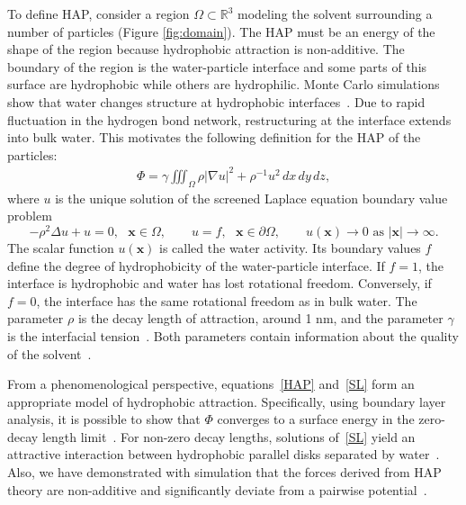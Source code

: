 To define HAP, consider a region $\Omega \subset \mathbb{R}^3$  modeling
the solvent surrounding a number of particles (Figure \ref{fig:domain}).
The HAP must be an energy of the shape of the region because hydrophobic
attraction is non-additive. The boundary of the region is the
water-particle interface and some parts of this surface are hydrophobic
while others are hydrophilic. Monte Carlo simulations show that water
changes structure at hydrophobic interfaces~\cite{Luzar1987,
Jonsson2006, Varilly2011}. Due to rapid fluctuation in the hydrogen bond
network, restructuring at the interface extends into bulk water. This
motivates the following definition for the HAP of the particles:
\begin{align}
\label{HAP}
  \Phi = \gamma \iiint_{\Omega} \rho |\nabla u|^2 + \rho^{-1}u^2 \,dx \,dy \,dz, 
\end{align}
where $u$ is the unique solution of the screened Laplace equation boundary value problem 
\begin{equation}
  \label{SL}
  -\rho^2 \Delta u + u = 0, \mbox{ } \mathbf{x} \in \Omega, \qquad
  u = f,  \mbox{ } \mathbf{x} \in \partial \Omega, \qquad 
  u(\mathbf{x}) \to 0 \mbox{ as } |\mathbf{x}| \to \infty.
\end{equation}
The scalar function $u(\mathbf{x})$ is called the water activity. Its
boundary values $f$ define the degree of hydrophobicity of the
water-particle interface. If $f=1$, the interface is hydrophobic and
water has lost rotational freedom. Conversely, if $f=0$, the interface
has the same rotational freedom as in bulk water. The parameter $\rho$
is the decay length of attraction, around 1 nm, and the parameter
$\gamma$ is the interfacial tension~\cite{Israelachvili1954}. Both
parameters contain information about the quality of the
solvent~\cite{Discher2002}.

From a phenomenological perspective, equations~\eqref{HAP}
and~\eqref{SL} form an appropriate model of hydrophobic attraction.
Specifically, using boundary layer analysis, it is possible to show that
$\Phi$ converges to a surface energy in the zero-decay length
limit~\cite{Lee2018, Lin2015, Shibata2004}. For non-zero decay lengths,
solutions of~\eqref{SL} yield an attractive interaction between
hydrophobic parallel disks separated by water~\cite{Eriksson1989}. Also,
we have demonstrated with simulation that the forces derived from HAP
theory are non-additive and significantly deviate from a pairwise
potential~\cite{Meyer2006, Fu2018_SIAM}. 

